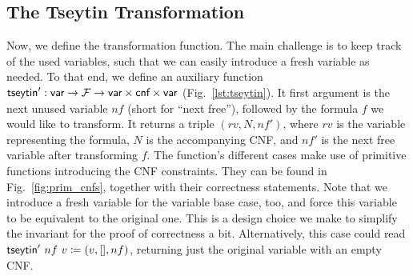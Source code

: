 \subsection{The Tseytin Transformation}
Now, we define the transformation function. The main challenge is to keep track of the used variables, such that we can easily introduce a fresh variable as needed. 
To that end, we define an auxiliary function $\textsf{tseytin}' : \textsf{var} \rightarrow \mathcal{F} \rightarrow \textsf{var} \times \textsf{cnf} \times \textsf{var}$ (Fig.~\ref{lst:tseytin}). 
It first argument is the next unused variable $nf$ (short for ``next free''), followed by the formula $f$ we would like to transform. It returns a triple $(rv, N, nf')$, where $rv$ is the variable representing the formula, $N$ is the accompanying CNF, and $nf'$ is the next free variable after transforming $f$. 
The function's different cases make use of primitive functions introducing the CNF constraints. They can be found in Fig.~\ref{fig:prim_cnfs}, together with their correctness statements. 
Note that we introduce a fresh variable for the variable base case, too, and force this variable to be equivalent to the original one. This is a design choice we make to simplify the invariant for the proof of correctness a bit. Alternatively, this case could read $\textsf{tseytin}'~nf~v \coloneqq (v, [], nf)$, returning just the original variable with an empty CNF.

